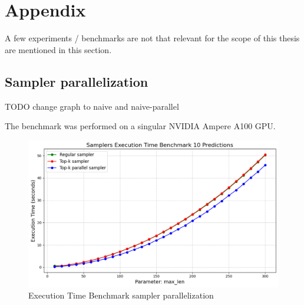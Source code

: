 \chapter{Appendix}
\label{chap:appendix}

A few experiments / benchmarks are not that relevant for the scope of this thesis are mentioned in this section.

\section{Sampler parallelization}
\label{sec:sampler_parallelization}
TODO change graph to naive and naive-parallel

The benchmark was performed on a singular NVIDIA Ampere A100 GPU.
\begin{figure}[h]
    \centering
    \includegraphics[width=\linewidth]{figures/appendix/sampler_parallel.png}
    \caption{Execution Time Benchmark sampler parallelization}
    \label{fig:sampler_parallelization}
\end{figure}
